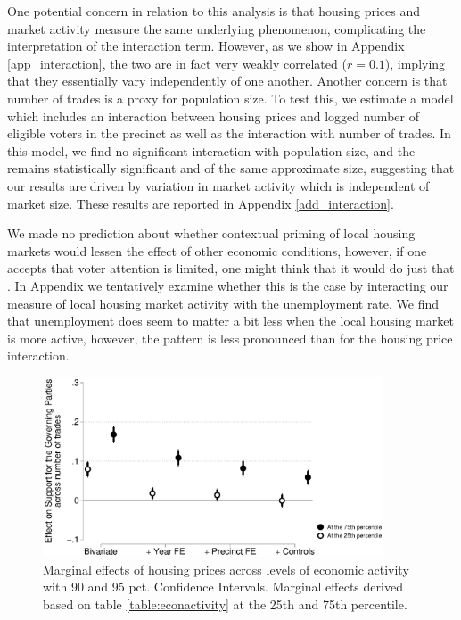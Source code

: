 \documentclass[12pt,a4paper]{article}
\begin{document}
	One potential concern in relation to this analysis is that housing prices and market activity measure the same underlying phenomenon, complicating the interpretation of the interaction term. However, as we show in Appendix \ref{app_interaction}, the two are in fact very weakly correlated ($r=0.1$), implying that they essentially vary independently of one another. Another concern is that number of trades is a proxy for population size. To test this, we estimate a model which includes an interaction between housing prices and logged number of eligible voters in the precinct as well as the interaction with number of trades. In this model, we find no significant interaction with population size, and the remains statistically significant and of the same approximate size, suggesting that our results are driven by variation in market activity which is independent of market size. These results are reported in Appendix \ref{add_interaction}.
	
	We made no prediction about whether contextual priming of local housing markets would lessen the effect of other economic conditions, however, if one accepts that voter attention is limited, one might think that it would do just that \citep[this is a common assertion in the broader priming literature, see for instance][]{ krosnick1990altering}. In Appendix \label{add_interaction} we tentatively examine whether this is the case by interacting our measure of local housing market activity with the unemployment rate. We find that unemployment does seem to matter a bit less when the local housing market is more active, however, the pattern is less pronounced than for the housing price interaction.  
	
	
	\begin{figure}[htbp!]
		\includegraphics[width=0.9\textwidth]{../figures/localactivity.eps}
		\centering
		\caption{Marginal effects of housing prices across levels of economic activity with 90 and 95 pct. Confidence Intervals.  Marginal effects derived based on table \ref{table:econactivity} at the 25th and 75th percentile.}\label{localactivity}
	\end{figure}
	
\end{document}
